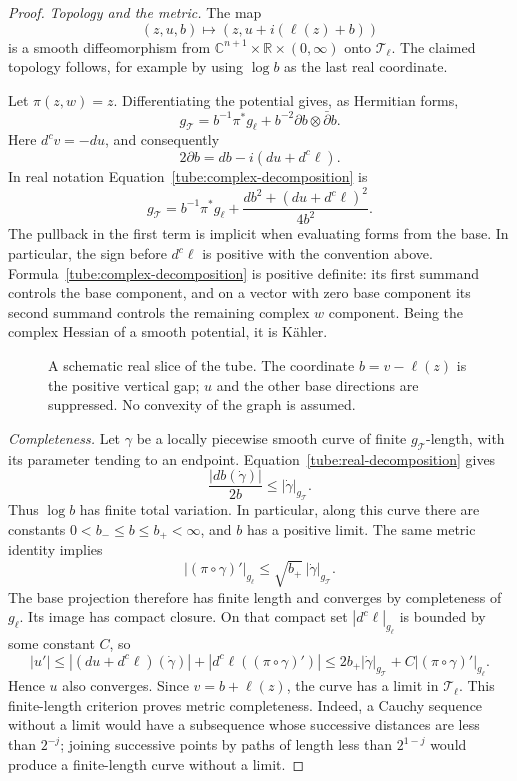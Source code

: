 \begin{proof}
\emph{Topology and the metric.}
The map
\[
 (z,u,b)\longmapsto (z,u+i(\ell(z)+b))
\]
is a smooth diffeomorphism from
$\mathbb C^{n+1}\times\mathbb R\times(0,\infty)$ onto $\mathcal T_\ell$.
The claimed topology follows, for example by using $\log b$ as the last
real coordinate.

Let $\pi(z,w)=z$.  Differentiating the potential gives, as Hermitian
forms,
\begin{equation}\label{tube:complex-decomposition}
 g_{\mathcal T}
 =b^{-1}\pi^*g_\ell+b^{-2}\partial b\otimes\bar\partial b.
\end{equation}
Here $d^cv=-du$, and consequently
\[
 2\partial b=db-i(du+d^c\ell).
\]
In real notation Equation~\eqref{tube:complex-decomposition} is
\begin{equation}\label{tube:real-decomposition}
 \boxed{\quad
 g_{\mathcal T}
 =b^{-1}\pi^*g_\ell
   +\frac{db^2+(du+d^c\ell)^2}{4b^2}.
 \quad}
\end{equation}
The pullback in the first term is implicit when evaluating forms from
the base.  In particular, the sign before $d^c\ell$ is positive with
the convention above.  Formula~\eqref{tube:complex-decomposition} is
positive definite: its first summand controls the base component, and
on a vector with zero base component its second summand controls the
remaining complex $w$ component.  Being the complex Hessian of a
smooth potential, it is K\"ahler.

\begin{figure}[tb]
 \centering
 
 \caption{A schematic real slice of the tube.  The coordinate
 $b=v-\ell(z)$ is the positive vertical gap; $u$ and the other base
 directions are suppressed.  No convexity of the graph is assumed.}
 \label{tube:geometry}
\end{figure}

\emph{Completeness.}
Let $\gamma$ be a locally piecewise smooth curve of finite
$g_{\mathcal T}$-length, with its parameter tending to an endpoint.
Equation~\eqref{tube:real-decomposition} gives
\[
 \frac{|db(\dot\gamma)|}{2b}\le |\dot\gamma|_{g_{\mathcal T}}.
\]
Thus $\log b$ has finite total variation.  In particular, along this
curve there are constants $0<b_-\le b\le b_+<\infty$, and $b$ has a
positive limit.  The same metric identity implies
\[
 |(\pi\circ\gamma)'|_{g_\ell}
 \le \sqrt{b_+}\,|\dot\gamma|_{g_{\mathcal T}}.
\]
The base projection therefore has finite length and converges by
completeness of $g_\ell$.  Its image has compact closure.  On that
compact set $|d^c\ell|_{g_\ell}$ is bounded by some constant $C$, so
\[
 |u'|
 \le |(du+d^c\ell)(\dot\gamma)|
       +|d^c\ell((\pi\circ\gamma)')|
 \le 2b_+|\dot\gamma|_{g_{\mathcal T}}
       +C|(\pi\circ\gamma)'|_{g_\ell}.
\]
Hence $u$ also converges.  Since $v=b+\ell(z)$, the curve has a limit
in $\mathcal T_\ell$.  This finite-length criterion proves metric
completeness.  Indeed, a Cauchy sequence without a limit would have a
subsequence whose successive distances are less than $2^{-j}$;
joining successive points by paths of length less than $2^{1-j}$
would produce a finite-length curve without a limit.


\end{proof}
